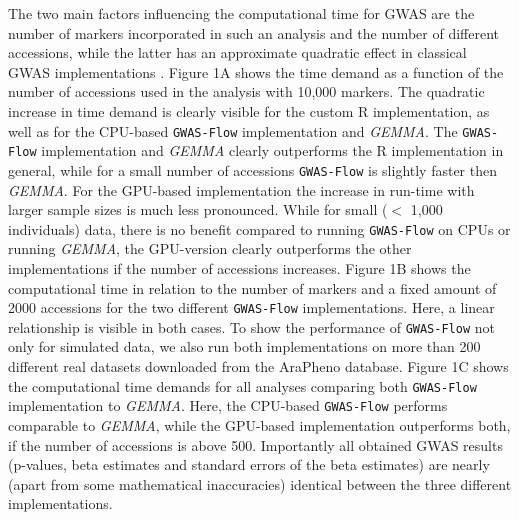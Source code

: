The two main factors influencing the computational time for GWAS are the number of markers incorporated in
such an analysis and the number of different accessions, while the latter has an approximate quadratic effect
in classical GWAS implementations \cite{Zhou2012}. Figure 1A shows the time demand as a function of the
number of accessions used in the analysis with 10,000 markers. The quadratic increase in time demand is
clearly visible for the custom R implementation, as well as for the CPU-based \texttt{GWAS-Flow}
implementation and \textit{GEMMA}. The \texttt{GWAS-Flow} implementation and \textit{GEMMA} clearly
outperforms the R implementation in general, while for a small number of accessions \texttt{GWAS-Flow} is
slightly faster then \textit{GEMMA}. For the GPU-based implementation the increase in run-time with larger
sample sizes is much less pronounced. While for small ($<$ 1,000 individuals) data, there is no benefit
compared to running \texttt{GWAS-Flow} on CPUs or running \textit{GEMMA}, the GPU-version clearly outperforms
the other implementations if the number of accessions increases. Figure 1B shows the computational time in
relation to the number of markers and a fixed amount of 2000 accessions for the two different
\texttt{GWAS-Flow} implementations. Here, a linear relationship is visible in both cases. To show the
performance of \texttt{GWAS-Flow} not only for simulated data, we also run both implementations on more than
200 different real datasets downloaded from the AraPheno database. Figure 1C shows the computational time
demands for all analyses comparing both \texttt{GWAS-Flow} implementation to \textit{GEMMA}. Here, the
CPU-based \texttt{GWAS-Flow} performs comparable to \textit{GEMMA}, while the GPU-based implementation
outperforms both, if the number of accessions is above 500. Importantly all obtained GWAS results (p-values,
beta estimates and standard errors of the beta estimates) are nearly (apart from some mathematical
inaccuracies) identical between the three different implementations.

